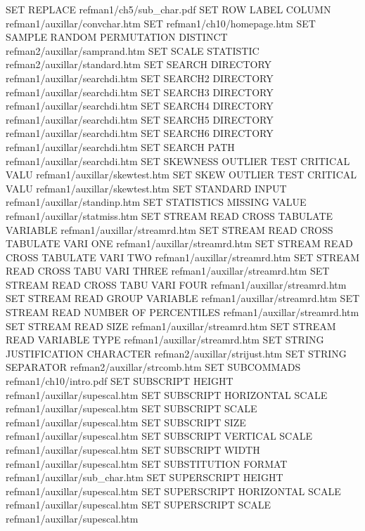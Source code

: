 SET REPLACE                             refman1/ch5/sub_char.pdf
SET ROW LABEL COLUMN                    refman1/auxillar/convchar.htm
SET                                     refman1/ch10/homepage.htm
SET SAMPLE RANDOM PERMUTATION DISTINCT  refman2/auxillar/samprand.htm
SET SCALE STATISTIC                     refman2/auxillar/standard.htm
SET SEARCH DIRECTORY                    refman1/auxillar/searchdi.htm
SET SEARCH2 DIRECTORY                   refman1/auxillar/searchdi.htm
SET SEARCH3 DIRECTORY                   refman1/auxillar/searchdi.htm
SET SEARCH4 DIRECTORY                   refman1/auxillar/searchdi.htm
SET SEARCH5 DIRECTORY                   refman1/auxillar/searchdi.htm
SET SEARCH6 DIRECTORY                   refman1/auxillar/searchdi.htm
SET SEARCH PATH                         refman1/auxillar/searchdi.htm
SET SKEWNESS OUTLIER TEST CRITICAL VALU refman1/auxillar/skewtest.htm
SET SKEW     OUTLIER TEST CRITICAL VALU refman1/auxillar/skewtest.htm
SET STANDARD INPUT                      refman1/auxillar/standinp.htm
SET STATISTICS MISSING VALUE            refman1/auxillar/statmiss.htm
SET STREAM READ CROSS TABULATE VARIABLE refman1/auxillar/streamrd.htm
SET STREAM READ CROSS TABULATE VARI ONE refman1/auxillar/streamrd.htm
SET STREAM READ CROSS TABULATE VARI TWO refman1/auxillar/streamrd.htm
SET STREAM READ CROSS TABU VARI THREE   refman1/auxillar/streamrd.htm
SET STREAM READ CROSS TABU VARI FOUR    refman1/auxillar/streamrd.htm
SET STREAM READ GROUP VARIABLE          refman1/auxillar/streamrd.htm
SET STREAM READ NUMBER OF PERCENTILES   refman1/auxillar/streamrd.htm
SET STREAM READ SIZE                    refman1/auxillar/streamrd.htm
SET STREAM READ VARIABLE TYPE           refman1/auxillar/streamrd.htm
SET STRING JUSTIFICATION CHARACTER      refman2/auxillar/strijust.htm
SET STRING SEPARATOR                    refman2/auxillar/strcomb.htm
SET SUBCOMMADS                          refman1/ch10/intro.pdf
SET SUBSCRIPT HEIGHT                    refman1/auxillar/supescal.htm
SET SUBSCRIPT HORIZONTAL SCALE          refman1/auxillar/supescal.htm
SET SUBSCRIPT SCALE                     refman1/auxillar/supescal.htm
SET SUBSCRIPT SIZE                      refman1/auxillar/supescal.htm
SET SUBSCRIPT VERTICAL SCALE            refman1/auxillar/supescal.htm
SET SUBSCRIPT WIDTH                     refman1/auxillar/supescal.htm
SET SUBSTITUTION FORMAT                 refman1/auxillar/sub_char.htm
SET SUPERSCRIPT HEIGHT                  refman1/auxillar/supescal.htm
SET SUPERSCRIPT HORIZONTAL SCALE        refman1/auxillar/supescal.htm
SET SUPERSCRIPT SCALE                   refman1/auxillar/supescal.htm
